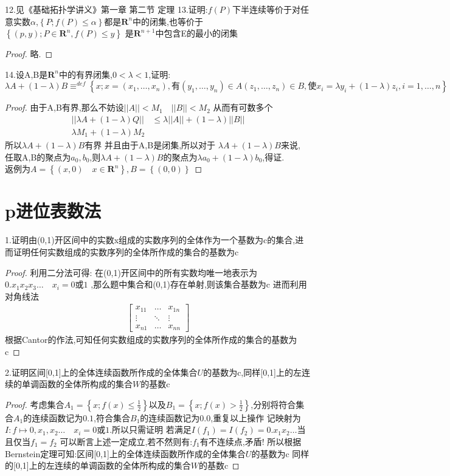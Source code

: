 12.见《基础拓扑学讲义》第一章 第二节 定理
13.证明:\(f(P)\)下半连续等价于对任意实数\(\alpha\),\(\left\{P;f(P) \leq \alpha\right\}\)都是\(\mathbf{R}^n\)中的闭集,也等价于\(\left\{(p,y); P \in \mathbf{R}^n ,f(P) \leq y \right\}\) 是\(\mathbf{R}^{n+1}\)中包含E的最小的闭集
\begin{proof}
     略.
\end{proof}
14.设A,B是\(\mathbf{R}^n\)中的有界闭集,\(0<\lambda<1\),证明:
\[\lambda A + (1-\lambda)B \equiv^{def}\left\{x ;x = (x_1,\dots , x_n), \text{有} (y_1,\dots,y_n) \in A (z_1,\dots ,z_n) \in B, \text{使} x_i =\lambda y_i +(1-\lambda) z_i , i =1,\dots , n \right\}\]
\begin{proof}
    由于A,B有界,那么不妨设\(||A|| < M_1 \quad ||B|| < M_2\) 从而有可数多个\begin{align*}
        || \lambda A + (1-\lambda)Q|| &\leq \lambda ||A|| + (1-\lambda) || B||  \\ 
        \lambda M_1 +(1-\lambda)M_2
    \end{align*}
    所以\(\lambda A + (1-\lambda)B \)有界
    并且由于A,B是闭集,所以对于 \(\lambda A +(1-\lambda) B \)来说, 任取A,B的聚点为\(a_0 , b_0\),则\(\lambda A +(1-\lambda) B \)的聚点为\(\lambda a_0 + (1-\lambda)b_0\),得证.
    \\ 
    返例为\(A= \left\{(x,0)  \quad  x \in \mathbf{R}^n \right\} , B=\left\{(0,0) \right\}\)
\end{proof}
\section{p进位表数法}
1.证明由(0,1)开区间中的实数x组成的实数序列的全体作为一个基数为c的集合,进而证明任何实数组成的实数序列的全体所作成的集合的基数为c
\begin{proof}
    利用二分法可得: 在(0,1)开区间中的所有实数均唯一地表示为\(0.x_1x_2x_3\dots \quad x_i = 0\text{或}1 \) ,那么题中集合和(0,1)存在单射,则该集合基数为c 进而利用对角线法
    \begin{align*}
        \begin{bmatrix}
            x_{11} & \dots& x_{1n}  \\ 
            \vdots & \ddots & \vdots \\ 
            x_{n1} & \dots & x_{nn}
        \end{bmatrix}
    \end{align*}
    根据Cantor的作法,可知任何实数组成的实数序列的全体所作成的集合的基数为c
\end{proof}
2.证明区间[0,1]上的全体连续函数所作成的全体集合\(U\)的基数为c,同样[0,1]上的左连续的单调函数的全体所构成的集合\(W\)的基数c
\begin{proof}
    考虑集合\(A_1= \left\{x; f(x) \leq \frac{1}{2}\right\}\)以及\(B_1=\left\{x ;f(x) > \frac{1}{2}\right\}\),分别将符合集合\(A_1\)的连续函数记为\(0.1\),符合集合\(B_1\)的连续函数记为\(0.0\),重复以上操作 记映射为\(I: f \mapsto  0,x_1,x_2\dots \quad x_i = 0\text{或} 1 \).所以只需证明
    若满足\(I(f_1)=I(f_2)=0.x_1x_2\dots \)当且仅当\(f_1 =f_2 \)
    可以断言上述一定成立,若不然则有:\(f_1\)有不连续点,矛盾!
    所以根据Bernstein定理可知:区间[0,1]上的全体连续函数所作成的全体集合\(U\)的基数为c
    同样的[0,1]上的左连续的单调函数的全体所构成的集合\(W\)的基数c
\end{proof}

